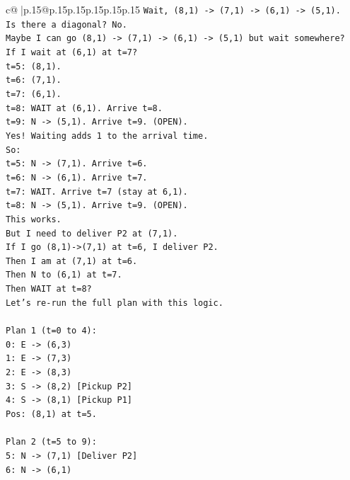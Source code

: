 \documentclass{article}
\begin{document}
{\begin{supertabular}{c@{$\;$}|p{.15\linewidth}@{}p{.15\linewidth}p{.15\linewidth}p{.15\linewidth}p{.15\linewidth}p{.15\linewidth}}
{{{\texttt{Wait, (8,1) {-}> (7,1) {-}> (6,1) {-}> (5,1).} \\
\texttt{Is there a diagonal? No.} \\
\texttt{Maybe I can go (8,1) {-}> (7,1) {-}> (6,1) {-}> (5,1) but wait somewhere?} \\
\texttt{If I wait at (6,1) at t=7?} \\
\texttt{t=5: (8,1).} \\
\texttt{t=6: (7,1).} \\
\texttt{t=7: (6,1).} \\
\texttt{t=8: WAIT at (6,1). Arrive t=8.} \\
\texttt{t=9: N {-}> (5,1). Arrive t=9. (OPEN).} \\
\texttt{Yes! Waiting adds 1 to the arrival time.} \\
\texttt{So:} \\
\texttt{t=5: N {-}> (7,1). Arrive t=6.} \\
\texttt{t=6: N {-}> (6,1). Arrive t=7.} \\
\texttt{t=7: WAIT. Arrive t=7 (stay at 6,1).} \\
\texttt{t=8: N {-}> (5,1). Arrive t=9. (OPEN).} \\
\texttt{This works.} \\
\texttt{But I need to deliver P2 at (7,1).} \\
\texttt{If I go (8,1){-}>(7,1) at t=6, I deliver P2.} \\
\texttt{Then I am at (7,1) at t=6.} \\
\texttt{Then N to (6,1) at t=7.} \\
\texttt{Then WAIT at t=8?} \\
\texttt{Let's re{-}run the full plan with this logic.} \\
\\ 
\texttt{Plan 1 (t=0 to 4):} \\
\texttt{0: E {-}> (6,3)} \\
\texttt{1: E {-}> (7,3)} \\
\texttt{2: E {-}> (8,3)} \\
\texttt{3: S {-}> (8,2) {[}Pickup P2{]}} \\
\texttt{4: S {-}> (8,1) {[}Pickup P1{]}} \\
\texttt{Pos: (8,1) at t=5.} \\
\\ 
\texttt{Plan 2 (t=5 to 9):} \\
\texttt{5: N {-}> (7,1) {[}Deliver P2{]}} \\
\texttt{6: N {-}> (6,1)} \\
}}}
\end{supertabular}}
\end{document}
